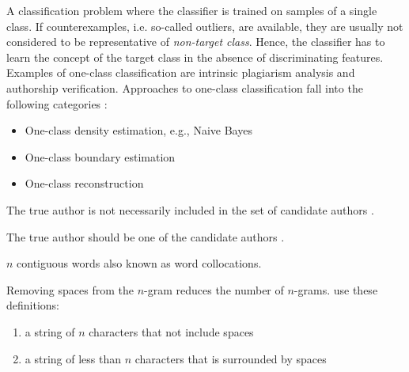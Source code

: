 \begin{definition}
    A classification problem where the classifier is trained on samples of a single class.
    If counterexamples, i.e. so-called outliers, are available, they are usually not considered to be representative of \textit{non-target class}.
    Hence, the classifier has to learn the concept of the target class in the absence of discriminating features.
    Examples of one-class classification are intrinsic plagiarism analysis and authorship verification.
    Approaches to one-class classification fall into the following categories \cite{stein_intrinsic_2011}:
    \begin{itemize}
        \item One-class density estimation, e.g., Naive Bayes
        \item One-class boundary estimation
        \item One-class reconstruction
    \end{itemize}
\end{definition}

\begin{definition}
    The true author is not necessarily included in the set of candidate authors \cite{stamatatos_survey_2009}.
\end{definition}

\begin{definition}
    The true author should be one of the candidate authors \cite{stamatatos_survey_2009,koppel_authorship_2011}.
\end{definition}

\begin{definition}
    [n-gram]
    $n$ contiguous words also known as word collocations.
\end{definition}

\begin{definition}
    Removing spaces from the $n$-gram reduces the number of $n$-grams.
    \citet{koppel_authorship_2011} use these definitions:
    \begin{enumerate}
        \item a string of $n$ characters that not include spaces
        \item a string of less than $n$ characters that is surrounded by spaces
    \end{enumerate}
\end{definition}